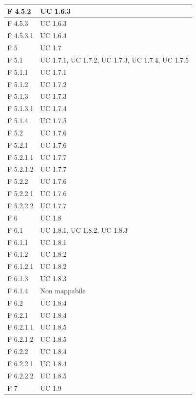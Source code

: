 \documentclass[a4paper,11pt]{article}
\begin{document}
\begin{longtable}{p{}p{}}
\midrule
F 4.5.2 & UC 1.6.3\\
\midrule
F 4.5.3 & UC 1.6.3\\
\midrule
F 4.5.3.1 & UC 1.6.4\\
\midrule
F 5 & UC 1.7\\
\midrule
F 5.1 & UC 1.7.1, UC 1.7.2, UC 1.7.3, UC 1.7.4, UC 1.7.5\\
\midrule
F 5.1.1 & UC 1.7.1\\
\midrule
F 5.1.2 & UC 1.7.2\\
\midrule
F 5.1.3 & UC 1.7.3\\
\midrule
F 5.1.3.1 & UC 1.7.4\\
\midrule
F 5.1.4 & UC 1.7.5\\
\midrule
F 5.2 & UC 1.7.6\\
\midrule
F 5.2.1 & UC 1.7.6\\
\midrule
F 5.2.1.1 & UC 1.7.7\\
\midrule
F 5.2.1.2 & UC 1.7.7\\
\midrule
F 5.2.2 & UC 1.7.6\\
\midrule
F 5.2.2.1 & UC 1.7.6\\
\midrule
F 5.2.2.2 & UC 1.7.7\\
\midrule
F 6 & UC 1.8\\
\midrule
F 6.1 & UC 1.8.1, UC 1.8.2, UC 1.8.3\\
\midrule
F 6.1.1 & UC 1.8.1\\
\midrule
F 6.1.2 & UC 1.8.2\\
\midrule
F 6.1.2.1 & UC 1.8.2\\
\midrule
F 6.1.3 & UC 1.8.3\\
\midrule
F 6.1.4 & Non mappabile\\
\midrule
F 6.2 & UC 1.8.4\\
\midrule
F 6.2.1 & UC 1.8.4\\
\midrule
F 6.2.1.1 & UC 1.8.5\\
\midrule
F 6.2.1.2 & UC 1.8.5\\
\midrule
F 6.2.2 & UC 1.8.4\\
\midrule
F 6.2.2.1 & UC 1.8.4\\
\midrule
F 6.2.2.2 & UC 1.8.5\\
\midrule
F 7 & UC 1.9\\
\midrule

			
			\end{longtable}
			
\end{document}
